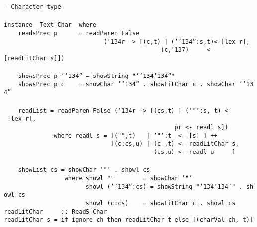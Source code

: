 \eprogB\noindent\bprogB
\mbox{\tt --\ Character\ type}\\
\mbox{\tt }\\
\mbox{\tt instance\ \ Text\ Char\ \ where}\\
\mbox{\tt \ \ \ \ readsPrec\ p\ \ \ \ \ \ =\ readParen\ False}\\
\mbox{\tt \ \ \ \ \ \ \ \ \ \ \ \ \ \ \ \ \ \ \ \ \ \ \ \ \ \ \ \ ({\char'134}r\ ->\ [(c,t)\ |\ ('{\char'134}'':s,t)<-[lex\ r],}\\
\mbox{\tt \ \ \ \ \ \ \ \ \ \ \ \ \ \ \ \ \ \ \ \ \ \ \ \ \ \ \ \ \ \ \ \ \ \ \ \ \ \ \ \ \ \ \ \ (c,{\char'137})\ \ \ \ \ <-[readLitChar\ s]])}\\
\mbox{\tt }\\
\mbox{\tt \ \ \ \ showsPrec\ p\ '{\char'134}''\ =\ showString\ "'{\char'134}{\char'134}''"}\\
\mbox{\tt \ \ \ \ showsPrec\ p\ c\ \ \ \ =\ showChar\ '{\char'134}''\ .\ showLitChar\ c\ .\ showChar\ '{\char'134}''}\\
\mbox{\tt }\\
\mbox{\tt \ \ \ \ readList\ =\ readParen\ False\ ({\char'134}r\ ->\ [(cs,t)\ |\ ('"':s,\ t)\ <-\ [lex\ r],}\\
\mbox{\tt \ \ \ \ \ \ \ \ \ \ \ \ \ \ \ \ \ \ \ \ \ \ \ \ \ \ \ \ \ \ \ \ \ \ \ \ \ \ \ \ \ \ \ \ \ \ \ \ pr\ <-\ readl\ s])}\\
\mbox{\tt \ \ \ \ \ \ \ \ \ \ \ \ \ \ where\ readl\ s\ =\ [("",t)\ \ \ |\ '"':t\ \ <-\ [s]\ ]\ ++}\\
\mbox{\tt \ \ \ \ \ \ \ \ \ \ \ \ \ \ \ \ \ \ \ \ \ \ \ \ \ \ \ \ \ \ [(c:cs,u)\ |\ (c\ ,t)\ <-\ readLitChar\ s,}\\
\mbox{\tt \ \ \ \ \ \ \ \ \ \ \ \ \ \ \ \ \ \ \ \ \ \ \ \ \ \ \ \ \ \ \ \ \ \ \ \ \ \ \ \ \ \ (cs,u)\ <-\ readl\ u\ \ \ \ \ ]}\\
\mbox{\tt }\\
\mbox{\tt \ \ \ \ showList\ cs\ =\ showChar\ '"'\ .\ showl\ cs}\\
\mbox{\tt \ \ \ \ \ \ \ \ \ \ \ \ \ \ \ \ \ where\ showl\ ""\ \ \ \ \ \ \ \ =\ showChar\ '"'}\\
\mbox{\tt \ \ \ \ \ \ \ \ \ \ \ \ \ \ \ \ \ \ \ \ \ \ \ showl\ ('{\char'134}'':cs)\ =\ showString\ "{\char'134}{\char'134}'"\ .\ showl\ cs}\\
\mbox{\tt \ \ \ \ \ \ \ \ \ \ \ \ \ \ \ \ \ \ \ \ \ \ \ showl\ (c:cs)\ \ \ \ =\ showLitChar\ c\ .\ showl\ cs}
\eprogB\noindent\bprogB
\mbox{\tt readLitChar\ \ \ \ \ ::\ ReadS\ Char}\\
\mbox{\tt readLitChar\ s\ =\ if\ ignore\ ch\ then\ readLitChar\ t\ else\ [(charVal\ ch,\ t)]}\\

